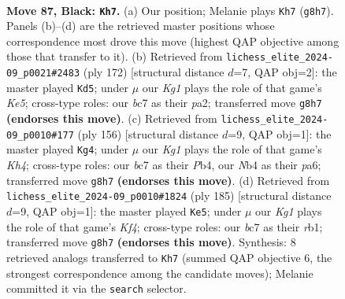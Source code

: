 \documentclass[11pt]{article}
\begin{document}
\clearpage

\begin{figure}[p]\centering
\begin{subfigure}{0.46\textwidth}\centering
\resizebox{\linewidth}{!}{%
\newchessgame
\chessboard[
  setfen={6k1/2B5/8/8/1nb4K/8/5P2/8 b - - 20 87},
  showmover=false,
  pgfstyle=straightmove, color=movearrow, markmove={g8-h7}
]}
\caption{}
\end{subfigure}\hfill
\begin{subfigure}{0.46\textwidth}\centering
\resizebox{\linewidth}{!}{%
\newchessgame
\chessboard[
  setfen={2k5/8/8/4K3/8/8/p7/B7 w - - 50 87},
  showmover=false,
  pgfstyle=straightmove, color=movearrow, markmove={e5-d5}
]}
\caption{}
\end{subfigure}
\\[4pt]
\begin{subfigure}{0.46\textwidth}\centering
\resizebox{\linewidth}{!}{%
\newchessgame
\chessboard[
  setfen={8/8/p3k3/8/1P5K/8/8/4B3 w - - 3 79},
  showmover=false,
  pgfstyle=straightmove, color=movearrow, markmove={h4-g4}
]}
\caption{}
\end{subfigure}\hfill
\begin{subfigure}{0.46\textwidth}\centering
\resizebox{\linewidth}{!}{%
\newchessgame
\chessboard[
  setfen={8/7b/8/5k2/8/4K3/8/1R6 b - - 46 93},
  showmover=false,
  pgfstyle=straightmove, color=movearrow, markmove={f5-e5}
]}
\caption{}
\end{subfigure}
\caption{\textbf{Move 87, Black: \texttt{Kh7}.} (a) Our position; Melanie plays \texttt{Kh7} (\texttt{g8h7}). Panels (b)--(d) are the retrieved master positions whose correspondence most drove this move (highest QAP objective among those that transfer to it). (b) Retrieved from \texttt{lichess\_elite\_2024-09\_p0021\#2483} (ply 172) [structural distance $d$=7, QAP obj=2]: the master played \texttt{Kd5}; under $\mu$ our \emph{Kg1} plays the role of that game's \emph{Ke5}; cross-type roles: our \emph{b}c7 as their \emph{p}a2; transferred move \texttt{g8h7} \textbf{(endorses this move)}. (c) Retrieved from \texttt{lichess\_elite\_2024-09\_p0010\#177} (ply 156) [structural distance $d$=9, QAP obj=1]: the master played \texttt{Kg4}; under $\mu$ our \emph{Kg1} plays the role of that game's \emph{Kh4}; cross-type roles: our \emph{b}c7 as their \emph{P}b4, our \emph{N}b4 as their \emph{p}a6; transferred move \texttt{g8h7} \textbf{(endorses this move)}. (d) Retrieved from \texttt{lichess\_elite\_2024-09\_p0010\#1824} (ply 185) [structural distance $d$=9, QAP obj=1]: the master played \texttt{Ke5}; under $\mu$ our \emph{Kg1} plays the role of that game's \emph{Kf4}; cross-type roles: our \emph{b}c7 as their \emph{r}b1; transferred move \texttt{g8h7} \textbf{(endorses this move)}. Synthesis: 8 retrieved analogs transferred to \texttt{Kh7} (summed QAP objective 6, the strongest correspondence among the candidate moves); Melanie committed it via the \texttt{search} selector.}
\label{fig:thought-m173}
\end{figure}
\end{document}
